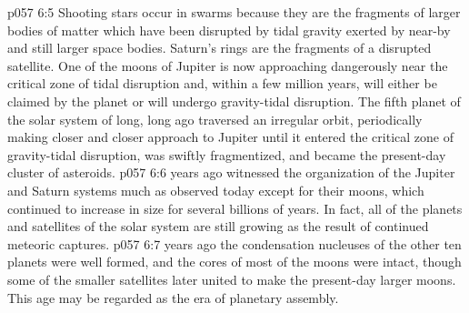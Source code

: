 \vs p057 6:5 Shooting stars occur in swarms because they are the fragments of larger bodies of matter which have been disrupted by tidal gravity exerted by near-by and still larger space bodies. Saturn’s rings are the fragments of a disrupted satellite. One of the moons of Jupiter is now approaching dangerously near the critical zone of tidal disruption and, within a few million years, will either be claimed by the planet or will undergo gravity\hyp{}tidal disruption. The fifth planet of the solar system of long, long ago traversed an irregular orbit, periodically making closer and closer approach to Jupiter until it entered the critical zone of gravity\hyp{}tidal disruption, was swiftly fragmentized, and became the present\hyp{}day cluster of asteroids.
\vs p057 6:6 \pc {} years ago witnessed the organization of the Jupiter and Saturn systems much as observed today except for their moons, which continued to increase in size for several billions of years. In fact, all of the planets and satellites of the solar system are still growing as the result of continued meteoric captures.
\vs p057 6:7 \pc {} years ago the condensation nucleuses of the other ten planets were well formed, and the cores of most of the moons were intact, though some of the smaller satellites later united to make the present\hyp{}day larger moons. This age may be regarded as the era of planetary assembly.
